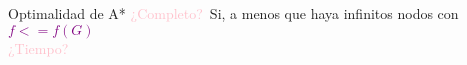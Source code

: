 \begin{frame}{Optimalidad de A*}
    \textcolor{Pink}{¿Completo?}\, Si, a menos que haya infinitos nodos con \textcolor{Purple}{$f <= f(G)$}
    \\
    \textcolor{Pink}{¿Tiempo?}
\end{frame}